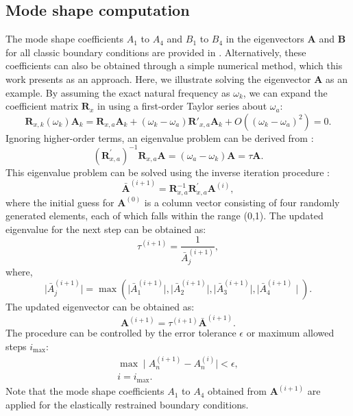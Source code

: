 \documentclass[preprint,12pt,number]{elsarticle}
\begin{document}
\subsection{Mode shape computation}\label{sec:Mode shape}
The mode shape coefficients $ A_1 $ to $ A_4 $ and $ B_1 $ to $ B_4$ in the eigenvectors $\mathbf{A}$ and $\mathbf{B}$ for all classic boundary conditions are provided in \cite{xing2020extended,xing2020improved}. 
Alternatively, these coefficients can also be obtained through a simple numerical method, which this work presents as an approach.
Here, we illustrate solving the eigenvector $\mathbf{A}$ as an example.
By assuming the exact natural frequency as $\omega_k$, we can expand the coefficient matrix $ \mathbf{R}_{x} $ in  using a first-order Taylor series about $\omega_a$:
%
\begin{equation}\label{eq:Taylor}
\mathbf{R}_{x,k}(\omega_k)\mathbf{A}_k = \mathbf{R}_{x,a}\mathbf{A}_k + (\omega_k - \omega_a)\mathbf{R}'_{x,a}\mathbf{A}_k + O\left((\omega_k - \omega_a)^2\right) = 0.
\end{equation}
%
Ignoring higher-order terms, an eigenvalue problem can be derived from :
%
\begin{equation}\label{eq:Newgeigen}
(\mathbf{R}^{'}_{x,a})^{-1} \mathbf{R}_{x,a} \mathbf{A} = (\omega_a - \omega_k)\mathbf{A} = \tau \mathbf{A}.
\end{equation}
%
This eigenvalue problem can be solved using the inverse iteration procedure \cite{yuan2004second}:
%
\begin{equation}\label{eq:Inversepower}
\bar{\mathbf{A}}^{(i+1)} = \mathbf{R}_{x,a}^{-1} \mathbf{R}^{'}_{x,a} \mathbf{A}^{(i)},	
\end{equation}
%
where the initial guess for $\mathbf{A}^{(0)}$ is a column vector consisting of four randomly generated elements, each of which falls within the range (0,1). The updated eigenvalue for the next step can be obtained as:
%
\begin{equation}\label{eq:Newgeigenvalue}
\tau^{(i+1)} = \frac{1}{\bar{A}_j^{(i+1)}},
\end{equation}
%
where,
%
\begin{equation}\label{eq:updatetau}
\mid \bar{A}_j^{(i+1)} \mid = \max(\mid \bar{A}_1^{(i+1)} \mid, \mid \bar{A}_2^{(i+1)} \mid, \mid\bar{A}_3^{(i+1)}\mid , \mid \bar{A}_4^{(i+1)} \mid).
\end{equation}
%
The updated eigenvector can be obtained as:
%
\begin{equation}\label{eq:updateeigenvalue}
\mathbf{A}^{(i+1)} = \tau^{(i+1)} \bar{\mathbf{A}}^{(i+1)}.
\end{equation}
%
The procedure can be controlled by the error tolerance \( \epsilon \) or maximum allowed steps \( i_{\text{max}} \):
%
\begin{subequations}
\begin{align}
	\max \mid A_n^{(i+1)} - A_n^{(i)} \mid < \epsilon, \\ 
	i = i_{\text{max}}.
\end{align}
\end{subequations}
%
Note that the mode shape coefficients $A_1$ to $A_4$ obtained from $\mathbf{A}^{(i+1)}$ are applied for the elastically restrained boundary conditions.
\end{document}
